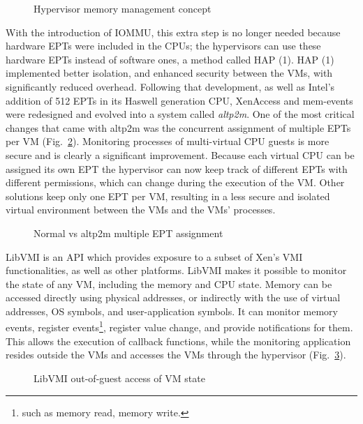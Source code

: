 \begin{figure}
	\centering
	
	\caption{Hypervisor memory management concept}
	\label{fig:hypmm}
\end{figure}

\par With the introduction of \ac{IOMMU}, this extra step is no longer needed because hardware \acp{EPT} were included in the \ac{CPU}s; the hypervisors can use these hardware \acp{EPT} instead of software ones, a method called \ac{HAP (1)}. \ac{HAP (1)} implemented better isolation, and enhanced security between the \acp{VM}, with significantly reduced overhead. Following that development, as well as Intel's addition of 512 \acp{EPT} in its Haswell generation \ac{CPU}, XenAccess and mem-events were redesigned and evolved into a system called \emph{altp2m}. One of the most critical changes that came with altp2m was the concurrent assignment of multiple \ac{EPT}s per \ac{VM} (Fig.~\ref{fig:ept}). Monitoring processes of multi-virtual \ac{CPU} guests is more secure and is clearly a significant improvement. Because each virtual \ac{CPU} can be assigned its own \ac{EPT} the hypervisor can now keep track of different \acp{EPT} with different permissions, which can change during the execution of the \ac{VM}. Other solutions keep only one \ac{EPT} per \ac{VM}, resulting in a less secure and isolated virtual environment between the \acp{VM} and the \acp{VM}' processes.

\begin{figure}[ht]
	\centering
	\scalebox{0.95}{}
	\caption{Normal vs altp2m multiple \ac{EPT} assignment}
	\label{fig:ept}
\end{figure}

\par LibVMI is an \ac{API} which provides exposure to a subset of Xen’s \ac{VMI} functionalities, as well as other platforms. LibVMI makes it possible to monitor the state of any \ac{VM}, including the memory and \ac{CPU} state. Memory can be accessed directly using physical addresses, or indirectly with the use of virtual addresses, \ac{OS} symbols, and user-application symbols. It can monitor memory events, register events\footnote{such as memory read, memory write.}, register value change, and provide notifications for them. This allows the execution of callback functions, while the monitoring application resides outside the \acp{VM} and accesses the \acp{VM} through the hypervisor (Fig.~\ref{fig:libvmi}). 


\begin{figure}[ht]
	\centering
	
	\caption{LibVMI out-of-guest access of \ac{VM} state}
	\label{fig:libvmi}
\end{figure}

